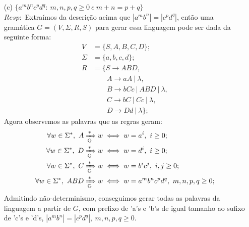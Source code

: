 \documentclass{homework}
\begin{document}
\begin{itemize}
\newpage		
		
		\item[(c)] $\{a^m b^n c^p d^q:\ m,n,p,q \geq 0\ e\ m + n = p + q\}$\\
		$Resp:$ Extraímos da descrição acima que $|a^m b^n| = |c^p d^q|$, então uma gramática $G = (V, \Sigma, R, S)$ para gerar essa linguagem pode ser dada da seguinte forma: %
		\begin{align*}
			V &= \{S, A, B, C, D\};\\
			\Sigma &= \{a,b,c,d\};\\
			R &= \{S \rightarrow ABD,\\
				&\qquad	A \rightarrow aA\ |\ \lambda, \\
				&\qquad	B \rightarrow bCc\ |\ ABD\ |\ \lambda, \\
				&\qquad	C \rightarrow bC\ |\ Cc\ |\ \lambda, \\
				&\qquad	D \rightarrow Dd\ |\ \lambda\};
		\end{align*}
		Agora observemos as palavras que as regras geram:
		\begin{align*}
			\forall w \in \Sigma^*,\  A & \xRightarrow[\text{G}]{*} w \iff w = a^i,\ i \geq 0;\\
			\forall w \in \Sigma^*,\  D & \xRightarrow[\text{G}]{*} w \iff w = d^i,\ i \geq 0;\\
			\forall w \in \Sigma^*,\  C & \xRightarrow[\text{G}]{*} w \iff w = b^i c^j,\ i,j \geq 0;\\
			\forall w \in \Sigma^*,\ ABD  & \xRightarrow[\text{G}]{*} w \iff w = a^m b^n c^p d^q,\ m,n,p,q \geq 0;
		\end{align*}
		Admitindo não-determinismo, conseguimos gerar todas as palavras da linguagem a partir de $G$, com prefixo de 'a's e 'b's de igual tamanho ao sufixo de 'c's e 'd's, $|a^m b^n| = |c^p d^q|,\ m,n,p,q \geq 0$.
	\end{itemize}
\pagebreak
\end{document}
